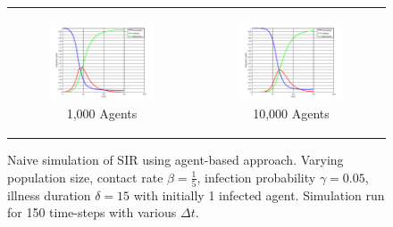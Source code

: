 \begin{figure}
\begin{center}
\begin{tabular}{c c}
    	\\
    	
		\begin{subfigure}[b]{0.3\textwidth}
			\centering
			\includegraphics[width=1\textwidth, angle=0]{./fig/step1_randmonad/SIR_1000agents_150t_1dt.png}
			\caption{1,000 Agents}
			\label{fig:sir_abs_approximating_1dt_1000agents}
		\end{subfigure}
		& 
		\begin{subfigure}[b]{0.3\textwidth}
			\centering
			\includegraphics[width=1\textwidth, angle=0]{./fig/step1_randmonad/SIR_10000agents_150t_1dt.png}
			\caption{10,000 Agents}
			\label{fig:sir_abs_approximating_1dt_10000agents}
		\end{subfigure}
	\end{tabular}
	
	\caption{Naive simulation of SIR using agent-based approach. Varying population size, contact rate $\beta = \frac{1}{5}$, infection probability $\gamma = 0.05$, illness duration $\delta = 15$ with initially 1 infected agent. Simulation run for 150 time-steps with various $\Delta t$.} 
	\label{fig:sir_abs_dynamics_naive}
\end{center}
\end{figure}

